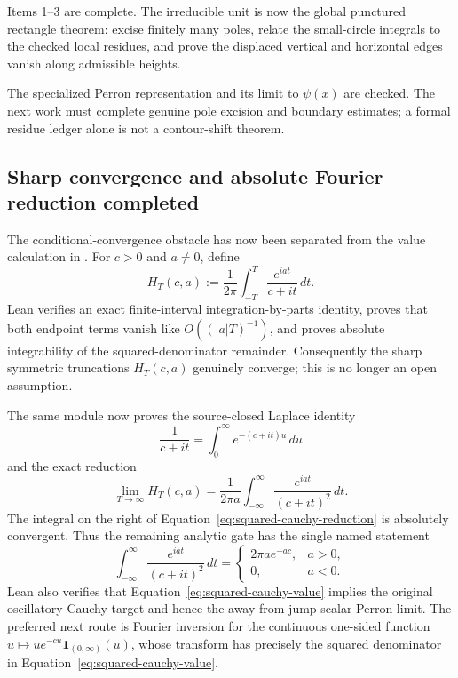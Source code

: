 \documentclass[11pt,a4paper]{article}
\begin{document}
Items 1--3 are complete. The irreducible unit is now the global punctured
rectangle theorem: excise finitely many poles, relate the small-circle
integrals to the checked local residues, and prove the displaced vertical and
horizontal edges vanish along admissible heights.

\begin{decisionbox}
The specialized Perron representation and its limit to $\psi(x)$ are checked.
The next work must complete genuine pole excision and boundary estimates; a
formal residue ledger alone is not a contour-shift theorem.
\end{decisionbox}

\subsection{Sharp convergence and absolute Fourier reduction completed}

The conditional-convergence obstacle has now been separated from the value
calculation in . For $c>0$ and
$a\neq0$, define
\[
  H_T(c,a):=\frac{1}{2\pi}\int_{-T}^{T}
    \frac{e^{iat}}{c+it}\,dt.
\]
Lean verifies an exact finite-interval integration-by-parts identity, proves
that both endpoint terms vanish like $O((|a|T)^{-1})$, and proves absolute
integrability of the squared-denominator remainder. Consequently the sharp
symmetric truncations $H_T(c,a)$ genuinely converge; this is no longer an open
assumption.

The same module now proves the source-closed Laplace identity
\[
  \frac{1}{c+it}=\int_0^\infty e^{-(c+it)u}\,du
\]
and the exact reduction
\begin{equation}
  \lim_{T\to\infty}H_T(c,a)
  =\frac{1}{2\pi a}\int_{-\infty}^{\infty}
    \frac{e^{iat}}{(c+it)^2}\,dt.
  \label{eq:squared-cauchy-reduction}
\end{equation}
The integral on the right of
Equation~\eqref{eq:squared-cauchy-reduction} is absolutely convergent. Thus the
remaining analytic gate has the single named statement
\begin{equation}
  \int_{-\infty}^{\infty}\frac{e^{iat}}{(c+it)^2}\,dt
  =
  \begin{cases}
    2\pi a e^{-ac},&a>0,\\
    0,&a<0.
  \end{cases}
  \label{eq:squared-cauchy-value}
\end{equation}
Lean also verifies that Equation~\eqref{eq:squared-cauchy-value} implies the
original oscillatory Cauchy target and hence the away-from-jump scalar Perron
limit. The preferred next route is Fourier inversion for the continuous
one-sided function $u\mapsto u e^{-cu}\mathbf{1}_{(0,\infty)}(u)$, whose
transform has precisely the squared denominator in
Equation~\eqref{eq:squared-cauchy-value}.
\end{document}
